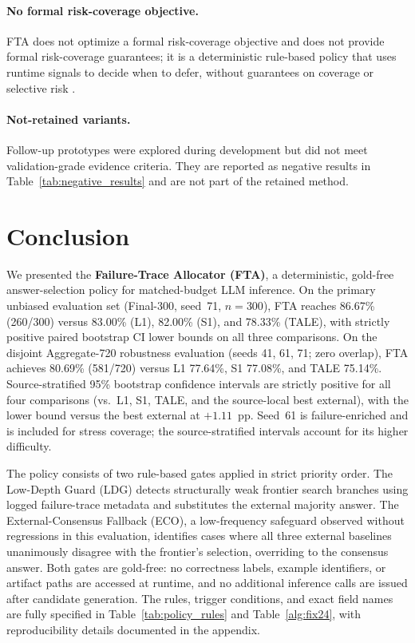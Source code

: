 \documentclass[smallcondensed]{svjour3}
\begin{document}
\paragraph{No formal risk-coverage objective.}
FTA does not optimize a formal risk-coverage objective and does not provide
formal risk-coverage guarantees; it is a deterministic rule-based policy that
uses runtime signals to decide when to defer, without guarantees on coverage or
selective risk \citep{geifman2017selectiveclassificationdeepneural,mozannar2023who}.

\paragraph{Not-retained variants.}
Follow-up prototypes were explored during development but did not meet
validation-grade evidence criteria.
They are reported as negative results in Table~\ref{tab:negative_results} and
are not part of the retained method.

\section{Conclusion}
\label{sec:conclusion}

We presented the \textbf{Failure-Trace Allocator (FTA)}, a deterministic,
gold-free answer-selection policy for matched-budget LLM inference.
On the primary unbiased evaluation set (Final-300, seed~71, $n=300$), FTA
reaches 86.67\% (260/300) versus 83.00\% (L1), 82.00\% (S1), and 78.33\%
(TALE), with strictly positive paired bootstrap CI lower bounds on all three
comparisons.
On the disjoint Aggregate-720 robustness evaluation (seeds 41, 61, 71; zero
overlap), FTA achieves 80.69\% (581/720) versus L1 77.64\%, S1 77.08\%, and
TALE 75.14\%.
Source-stratified 95\% bootstrap confidence intervals are strictly positive
for all four comparisons (vs.\ L1, S1, TALE, and the source-local best
external), with the lower bound versus the best external at $+1.11$~pp.
Seed~61 is failure-enriched and is included for stress coverage; the
source-stratified intervals account for its higher difficulty.

The policy consists of two rule-based gates applied in strict priority order.
The Low-Depth Guard (LDG) detects structurally weak frontier search branches
using logged failure-trace metadata and substitutes the external majority
answer.
The External-Consensus Fallback (ECO), a low-frequency safeguard observed
without regressions in this evaluation, identifies cases where all three external
baselines unanimously disagree with the frontier's selection, overriding
to the consensus answer.
Both gates are gold-free: no correctness labels, example identifiers, or
artifact paths are accessed at runtime, and no additional inference calls are
issued after candidate generation.
The rules, trigger conditions, and exact field names are fully specified in
Table~\ref{tab:policy_rules} and Table~\ref{alg:fix24}, with reproducibility
details documented in the appendix.
\end{document}
